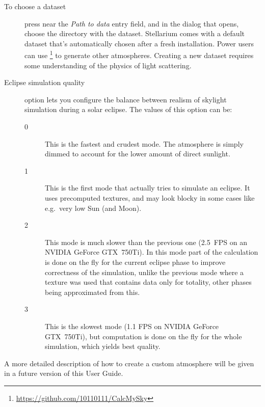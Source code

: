 \begin{description}
\item[To choose a dataset] press 
  near the \emph{Path to data} entry field, and in the dialog that
  opens, choose the directory with the dataset.  Stellarium comes with
  a default dataset that's automatically chosen after a fresh
  installation.  Power users can use
  \footnote{\url{https://github.com/10110111/CalcMySky}}
  to generate other atmospheres. Creating a new dataset requires some
  understanding of the physics of light scattering.
\item[Eclipse simulation quality] option lets you configure the
  balance between realism of skylight simulation during a solar
  eclipse. The values of this option can be:
  \begin{description}
  \item[0] This is the fastest and crudest mode. The atmosphere is
    simply dimmed to account for the lower amount of direct sunlight.
  \item[1] This is the first mode that actually tries to simulate an
    eclipse. It uses precomputed textures, and may look blocky in some
    cases like e.g.\ very low Sun (and Moon).
  \item[2] This mode is much slower than the previous one (2.5~FPS on
    an NVIDIA GeForce GTX~750Ti).  In this mode part of the
    calculation is done on the fly for the current eclipse phase to
    improve correctness of the simulation, unlike the previous mode
    where a texture was used that contains data only for totality,
    other phases being approximated from this.
  \item[3] This is the slowest mode (1.1 FPS on NVIDIA GeForce
    GTX~750Ti), but computation is done on the fly for the whole
    simulation, which yields best quality.
  \end{description}
\end{description}

\noindent A more detailed description of how to create a custom atmosphere will
be given in a future version of this User Guide.

